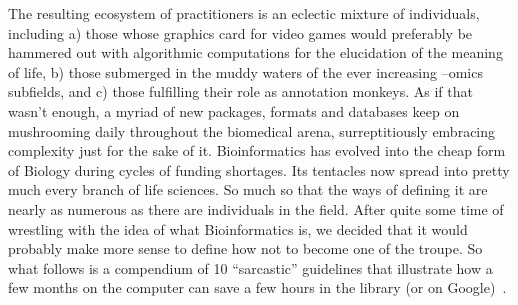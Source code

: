 \documentclass[11pt,twoside,a4paper]{article}
\begin{document}
The resulting ecosystem of practitioners is an eclectic mixture of individuals, including a) those whose graphics card for video games would preferably be hammered out with algorithmic computations for the elucidation of the meaning of life, b) those submerged in the muddy waters of the ever increasing --omics subfields, and c) those fulfilling their role as annotation monkeys. As if that wasn't enough, a myriad of new packages, formats and databases keep on mushrooming daily throughout the biomedical arena, surreptitiously embracing complexity just for the sake of it. Bioinformatics has evolved into the cheap form of Biology during cycles of funding shortages. Its tentacles now spread into pretty much every branch of life sciences. So much so that the ways of defining it are nearly as numerous as there are individuals in the field. After quite some time of wrestling with the idea of what Bioinformatics is, we decided that it would probably make more sense to define how not to become one of the troupe. So what follows is a compendium of 10 ``sarcastic'' guidelines that illustrate how a few months on the computer can save a few hours in the library (or on Google)~\cite{SevenSinsBioinformtaticqCarolGoble2007}.
\end{document}

